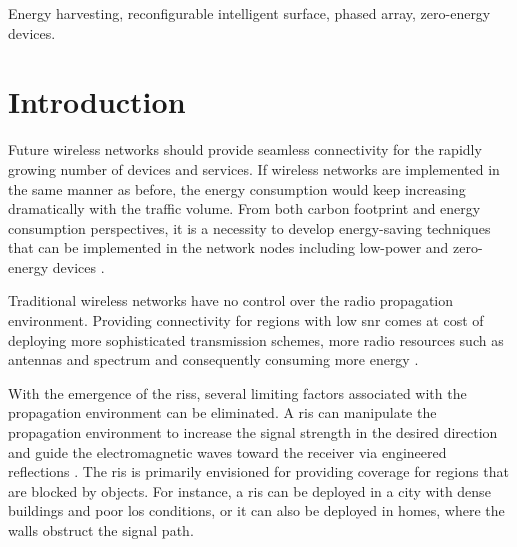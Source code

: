 \documentclass[conference]{IEEEtran}
\begin{document}
\begin{IEEEkeywords}
Energy harvesting, reconfigurable intelligent surface, phased array, zero-energy devices.\vspace{0mm}
\end{IEEEkeywords}

\IEEEpeerreviewmaketitle
\vspace{-1mm}
\section{Introduction}

{\color{black} Future wireless networks should provide seamless connectivity for the rapidly growing number of devices and services. If wireless networks are implemented in the same manner as before, the energy consumption would keep increasing dramatically with the traffic volume. From both carbon footprint and energy consumption perspectives, it is a necessity to develop energy-saving techniques that can be implemented in the network nodes including low-power and zero-energy devices \cite{MTavana_IoTJ_2021, MTavana_2022_ICC, Mtavana_VTCW_2022}.}




Traditional wireless networks  have no control over the radio propagation environment.
{\color{black} Providing connectivity for regions with low \gls*{snr} comes at cost of deploying more sophisticated transmission schemes, more radio resources such as antennas and spectrum and consequently consuming more energy} \cite{goldsmith2005wireless, 9140329}.




With the emergence of the \glspl*{ris}, several limiting factors associated with the propagation environment can be eliminated. A \gls*{ris}  can manipulate the propagation environment to increase the signal strength in the desired direction and guide the electromagnetic waves toward the receiver via engineered reflections \cite{9048622,6206517,9721205,9206044,wu2021intelligent}. The \gls*{ris} is primarily envisioned for providing coverage for regions that are blocked by objects\cite{9140329}. %
For instance, a \gls*{ris} can be deployed in a city with dense buildings and poor \gls*{los} conditions, or it can also be deployed in homes, where the walls obstruct the signal path. 
\end{document}
